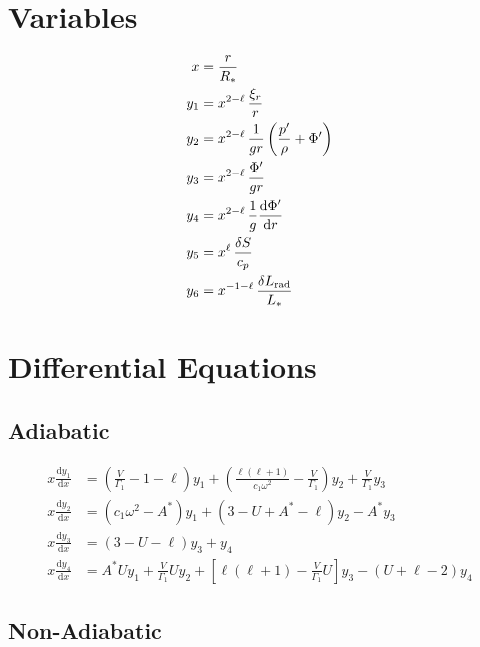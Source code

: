 \documentclass{article}
\newcommand{\diff}{\ensuremath{\mathrm{d}}}
\newcommand{\Vg}{\ensuremath{\frac{V}{\Gamma_{1}}}}
\newcommand{\As}{\ensuremath{A^{\ast}}}
\newcommand{\Rstar}{\ensuremath{R_{\ast}}}
\newcommand{\Lrad}{\ensuremath{L_{\rm rad}}}
\newcommand{\Lstar}{\ensuremath{L_{\ast}}}
\begin{document}
\section*{Variables}

\begin{align*}
x     &= \frac{r}{\Rstar} \\
y_{1} &= x^{2-\ell}\, \frac{\xi_{r}}{r} \\
y_{2} &= x^{2-\ell}\, \frac{1}{gr} \left( \frac{p'}{\rho} + \Phi' \right)\\
y_{3} &= x^{2-\ell}\, \frac{\Phi'}{gr}\\
y_{4} &= x^{2-\ell}\, \frac{1}{g} \frac{\diff \Phi'}{\diff r}\\
y_{5} &= x^{\ell}\, \frac{\delta S}{c_{p}}\\
y_{6} &= x^{-1-\ell}\, \frac{\delta \Lrad}{\Lstar}
\end{align*}


\section*{Differential Equations}


\subsection*{Adiabatic}

\begin{align*}
x \frac{\diff y_{1}}{\diff x} &=
\left(\Vg - 1 - \ell \right) y_{1} +
\left(\frac{\ell(\ell+1)}{c_{1} \omega^{2}} - \Vg \right) y_{2} +
\Vg y_{3} \\
x \frac{\diff y_{2}}{\diff x} &=
(c_{1} \omega^{2} - \As ) y_{1} +
(3 - U + \As - \ell) y_{2} -
\As y_{3} \\
x \frac{\diff y_{3}}{\diff x} &=
(3 - U - \ell) y_{3} +
y_{4} \\
x \frac{\diff y_{4}}{\diff x} &=
\As U y_{1} +
\Vg U y_{2} +
\left[ \ell(\ell+1) - \Vg U \right] y_{3} -
(U + \ell - 2) y_{4}
\end{align*}


\subsection*{Non-Adiabatic}
\end{document}
